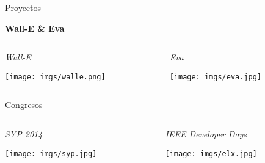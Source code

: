 \begin{frame}{Proyectos}
    \begin{center}
        \huge\textbf{Wall-E \& Eva}
    \end{center}
    
    \begin{columns}[t]\begin{column}{0.50\textwidth}
        \centering\large\textit{Wall-E}
        
        \texttt{[image: imgs/walle.png]}
    \end{column}\begin{column}{0.50\textwidth}
        \centering\large\textit{Eva}
        
        \texttt{[image: imgs/eva.jpg]}
    \end{column}\end{columns}
\end{frame}

\begin{frame}{Congresos}    
    \begin{columns}\begin{column}{0.50\textwidth}
        \centering\large\textit{SYP 2014}
        
        \texttt{[image: imgs/syp.jpg]}
    \end{column}\begin{column}{0.50\textwidth}
        \centering\large\textit{IEEE Developer Days}
        
        \texttt{[image: imgs/elx.jpg]}
    \end{column}\end{columns}
\end{frame}